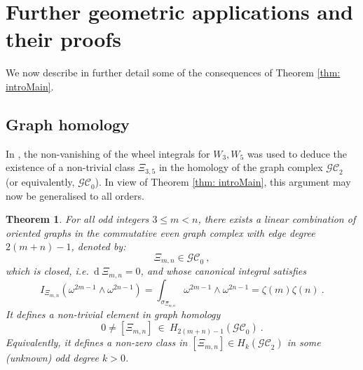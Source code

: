 \documentclass[10pt]{amsart}
\newcommand{\dd}{\mathrm{d}}
\theoremstyle{plain}
\newtheorem{thm}{Theorem}
\newcommand{\GC}{\mathcal{GC}}
\newcommand{\0}{\color{blue}{\mathsf{0}}}
\begin{document}
\section{Further geometric applications and their proofs} \label{sect: Consequences}

We now describe in further detail some of the consequences of Theorem \ref{thm: introMain}. 
\subsection{Graph homology}

In \cite{BrSigma}, the non-vanishing of the wheel integrals for $W_3, W_5$ was used to deduce the existence of a non-trivial  class $\Xi_{3,5}$ in the homology of the graph complex $\GC_2$ (or equivalently, $\GC_0$). In view of Theorem \ref{thm: introMain}, this argument may  now be generalised to all orders.  

\begin{thm}  \label{thm: Ximn} For all  odd integers $3\leq m<n$, there exists  a  linear combination of oriented graphs  in the commutative even graph complex with edge degree $2(m+n)-1$,  denoted by:
\[  \Xi_{m,n} \in \GC_0\ , \]
which is closed, i.e.\ $\dd \ \Xi_{m,n} =0$,  and whose canonical integral satisfies
\[ I_{\Xi_{m,n}}(\omega^{2m-1}\wedge \omega^{2n-1})=\int_{\sigma_{\Xi_{m,n}}} \omega^{2m-1} \wedge \omega^{2n-1} = \zeta(m) \zeta(n)\ .  \]
It defines a non-trivial element in graph homology
\[ 0 \neq [\Xi_{m,n} ] \ \in \  H_{2(m+n)-1}  (\GC_0)\ . \]
Equivalently, it defines a non-zero class in $ [\Xi_{m,n} ]  \in  H_{k}  (\GC_2)$ in some (unknown) odd  degree $k>0$. 
\end{thm}
\end{document}
